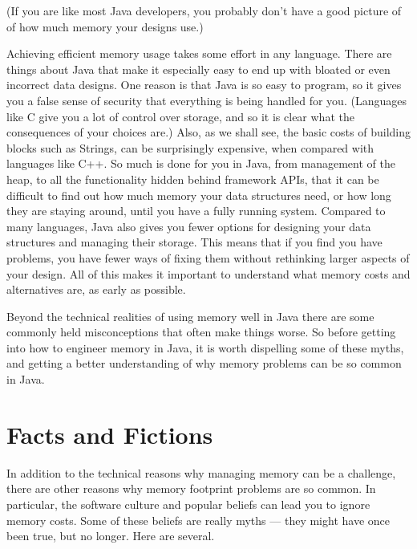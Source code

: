 (If you are like most Java developers, you probably don't have a good picture of
of how much memory your designs use.)

Achieving efficient memory usage takes some effort in any language. 
There are things about Java that make it especially easy to end up with bloated
or even incorrect data designs. One reason is that Java is so easy to program,
so it gives you a false sense of security that everything is being handled for you. (Languages like C give you a
lot of control over storage, and so it is clear what
the consequences of your choices are.) Also, as we shall see,
the basic costs of building blocks such as Strings, can be surprisingly expensive,
when compared with languages like C++. So much is done for you in
Java, from management of the heap, to all the functionality hidden behind framework APIs, that it can be
difficult to find out how much memory your data structures need, or how long
they are staying around, until you have a fully running system. Compared to
many languages, Java also gives you fewer options for designing your data
structures and managing their storage. This means that if you find you have
problems, you have fewer ways of fixing them without rethinking larger aspects of your design.
All of this makes it important to understand what memory
costs and alternatives are, as early as possible.


Beyond the technical realities of using memory well in Java there are some commonly held misconceptions that often make things worse. So before getting into how to engineer memory in Java, it is worth dispelling some
of these myths, and getting a better understanding of why memory problems
can be so common in Java.

\section{Facts and Fictions}

In addition to the technical reasons why managing memory can be a challenge, there
are other reasons why memory footprint problems are so common. In particular,
the software culture and popular beliefs can lead you to ignore memory
costs. Some of these beliefs are really myths --- they might have once
been true, but no longer. Here are several.

